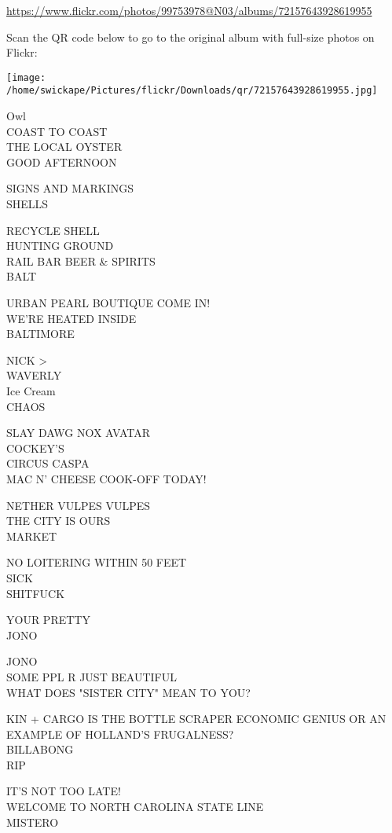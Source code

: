 \documentclass[10pt,letterpaper]{article}
\begin{document}
\url{https://www.flickr.com/photos/99753978@N03/albums/72157643928619955}

Scan the QR code below to go to the original album with full-size photos on Flickr:

\texttt{[image: /home/swickape/Pictures/flickr/Downloads/qr/72157643928619955.jpg]}


Owl\\
COAST TO COAST\\
THE LOCAL OYSTER\\
GOOD AFTERNOON

SIGNS AND MARKINGS\\
SHELLS

RECYCLE SHELL\\
HUNTING GROUND\\
RAIL BAR BEER \& SPIRITS\\
BALT

URBAN PEARL BOUTIQUE COME IN!\\
WE'RE HEATED INSIDE\\
BALTIMORE

NICK >\\
WAVERLY\\
Ice Cream\\
CHAOS

SLAY DAWG NOX AVATAR\\
COCKEY'S\\
CIRCUS CASPA\\
MAC N' CHEESE COOK{-}OFF TODAY!

NETHER VULPES VULPES\\
THE CITY IS OURS\\
MARKET

NO LOITERING WITHIN 50 FEET\\
SICK\\
SHITFUCK

YOUR PRETTY\\
JONO

JONO\\
SOME PPL R JUST BEAUTIFUL\\
WHAT DOES "SISTER CITY" MEAN TO YOU?

KIN + CARGO IS THE BOTTLE SCRAPER ECONOMIC GENIUS OR AN EXAMPLE OF HOLLAND'S FRUGALNESS?\\
BILLABONG\\
RIP

IT'S NOT TOO LATE!\\
WELCOME TO NORTH CAROLINA STATE LINE\\
MISTERO
\end{document}
